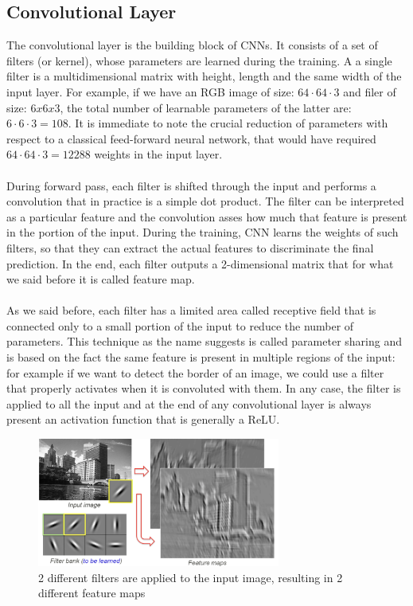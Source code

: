 \documentclass[LaM,binding=0.6cm]{sapthesis}
\begin{document}
\subsection{Convolutional Layer}
The convolutional layer is the building block of CNNs. It consists of a set of filters (or kernel), whose parameters are learned during the training. A a single filter is a multidimensional matrix with height, length and the same width of the input layer. For example, if we have an RGB image of size: $64\cdot64\cdot3$ and filer of size: $6x6x3$, the total number of learnable parameters of the latter are: $6\cdot6\cdot3=108$. It is immediate to note the crucial reduction of parameters with respect to a classical feed-forward neural network, that would have required $64\cdot64\cdot 3=12288$ weights in the input layer.\\\\During forward pass, each filter is shifted through the input and performs a convolution that in practice is a simple dot product. The filter can be interpreted as a particular feature and the convolution asses how much that feature is present in the portion of the input. During the training, CNN learns the weights of such filters, so that they can extract the actual features to discriminate the final prediction. In the end, each filter outputs a 2-dimensional matrix that for what we said before it is called feature map.\\\\As we said before, each filter has a limited area called receptive field that is connected only to a small portion of the input to reduce the number of parameters. This technique as the name suggests is called parameter sharing and is based on the fact the same feature is present in multiple regions of the input: for example if we want to detect the border of an image, we could use a filter that properly activates when it is convoluted with them. In any case, the filter is applied to all the input and at the end of any convolutional layer is always present an activation function that is generally a ReLU.
\begin{figure}   \centering
    \includegraphics[width=80mm,scale=0.7]{exfilter}
    \caption{2 different filters are applied to the input image, resulting in 2 different feature maps \cite{cnnstackoverflow}}
    \label{fig:exfilter}
\end{figure}
\end{document}
